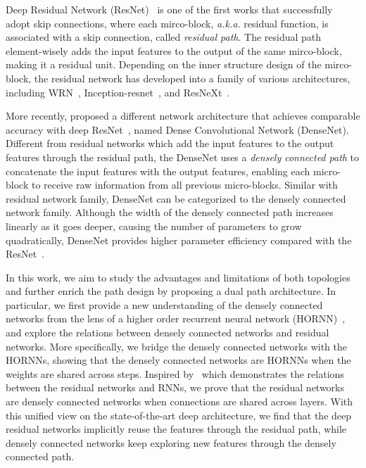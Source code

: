 \documentclass{article}
\begin{document}
Deep Residual Network (ResNet)~\citep{he2016deep} is one of the first works that successfully adopt skip connections, where each mirco-block, \emph{a.k.a.} residual function, is associated with a skip connection, called \emph{residual path}. The residual path element-wisely adds the input features to the output of the same mirco-block, making it a residual unit. Depending on the inner structure design of the mirco-block, the residual network has developed into a family of various architectures, including WRN~\citep{zagoruyko2016wide}, Inception-resnet~\cite{szegedy2016inception}, and ResNeXt~\citep{xie2016aggregated}. 

More recently, \citet{huang2016densely} proposed a different network architecture that achieves comparable accuracy with deep ResNet~\citep{he2016deep}, named Dense Convolutional Network (DenseNet). Different from residual networks which add the input features to the output features through the residual path, the DenseNet uses a \emph{densely connected path} to concatenate the input features with the output features, enabling each micro-block to receive raw information from all previous micro-blocks. Similar with residual network family, DenseNet can be categorized to the densely connected network family. Although the width of the densely connected path increases linearly as it goes deeper, causing the number of parameters to grow quadratically, DenseNet provides higher parameter efficiency compared with the ResNet~\citep{he2016deep}.

In this work, we aim to study the advantages and limitations of both topologies and further enrich the path design by proposing a dual path architecture. In particular, we first provide a new understanding of the densely connected networks from the lens of a higher order recurrent neural network (HORNN)~\citep{soltani2016higher}, and explore the relations between densely connected networks and residual networks. More specifically, we bridge the densely connected networks with the HORNNs, showing that the densely connected networks are HORNNs when the weights are shared across steps. Inspired by~\cite{liao2016bridging} which demonstrates the relations between the residual networks and RNNs, we prove that the residual networks are densely connected networks when connections are shared across layers. With this unified view on the state-of-the-art deep architecture, we find that the deep residual networks implicitly reuse the features through the residual path, while densely connected networks keep exploring new features through the densely connected path. 
\end{document}
